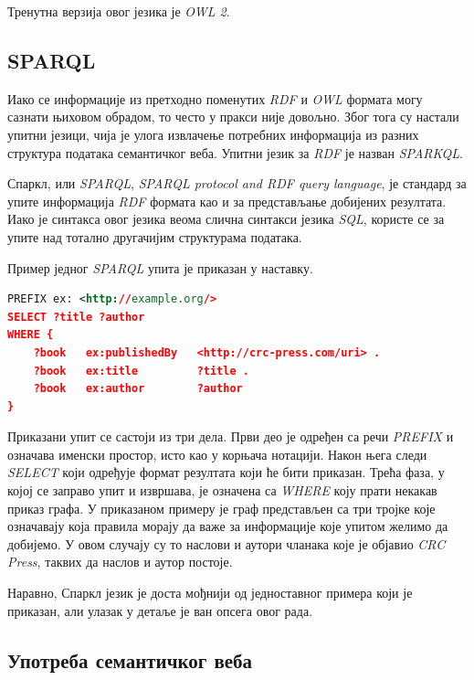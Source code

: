 \documentclass[12pt,oneside]{memoir}
\begin{document}
Тренутна верзија овог језика је \textit{OWL 2}. 


\subsection{SPARQL}
\label{subsec:semantic_query}

Иако се информације из претходно поменутих \textit{RDF} и \textit{OWL} формата могу сазнати њиховом обрадом, то често у пракси није довољно. Због тога су настали упитни језици, чија је улога извлачење потребних информација из разних структура података семантичког веба. Упитни језик за \textit{RDF} је назван \textit{SPARKQL}. \cite{semantic}

Спаркл, или \textit{SPARQL}, \textit{SPARQL protocol and RDF query language}, је стандард за упите информација \textit{RDF} формата као и за представљање добијених резултата. Иако је синтакса овог језика веома слична синтакси језика \textit{SQL}, користе се за упите над тотално другачијим структурама података. \cite{semantic}

Пример једног \textit{SPARQL} упита је приказан у наставку.

\begin{lstlisting}[language=XML]
PREFIX ex: <http://example.org/>
SELECT ?title ?author
WHERE { 
	?book   ex:publishedBy   <http://crc-press.com/uri> .
	?book   ex:title         ?title .
	?book   ex:author        ?author 
}
\end{lstlisting}

Приказани упит се састоји из три дела. Први део је одређен са речи  \textit{PREFIX} и означава именски простор, исто као у корњача нотацији. Након њега следи \textit{SELECT} који одређује формат резултата који ће бити приказан. Трећа фаза, у којој се заправо упит и извршава, је означена са \textit{WHERE} коју прати некакав приказ графа. У приказаном примеру је граф представљен са три тројке које означавају која правила морају да важе за информације које упитом желимо да добијемо. У овом случају су то наслови и аутори чланака које је објавио \textit{CRC Press}, таквих да наслов и аутор постоје. \cite{semantic}

Наравно, Спаркл језик је доста мођнији од једноставног примера који је приказан, али улазак у детаље је ван опсега овог рада.


\subsection{Употреба семантичког веба}
\label{subsec:semantic_end}
\end{document}
